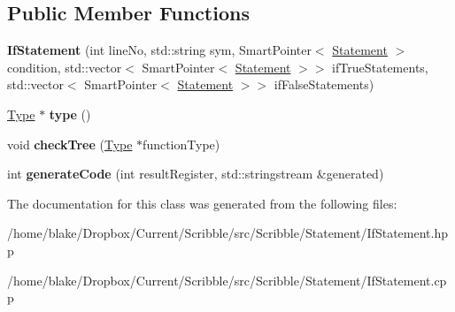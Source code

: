 \subsection*{Public Member Functions}
\begin{DoxyCompactItemize}
\item 
\hypertarget{class_scribble_core_1_1_if_statement_aaf95d7fc41a09df4f13d91a36bb6ce88}{{\bfseries If\-Statement} (int line\-No, std\-::string sym, Smart\-Pointer$<$ \hyperlink{class_scribble_core_1_1_statement}{Statement} $>$ condition, std\-::vector$<$ Smart\-Pointer$<$ \hyperlink{class_scribble_core_1_1_statement}{Statement} $>$$>$ if\-True\-Statements, std\-::vector$<$ Smart\-Pointer$<$ \hyperlink{class_scribble_core_1_1_statement}{Statement} $>$$>$ if\-False\-Statements)}\label{class_scribble_core_1_1_if_statement_aaf95d7fc41a09df4f13d91a36bb6ce88}

\item 
\hypertarget{class_scribble_core_1_1_if_statement_af5d5d3cc9c33f6879d254f11c2bec9eb}{\hyperlink{class_scribble_core_1_1_type}{Type} $\ast$ {\bfseries type} ()}\label{class_scribble_core_1_1_if_statement_af5d5d3cc9c33f6879d254f11c2bec9eb}

\item 
\hypertarget{class_scribble_core_1_1_if_statement_ade8ad73c43528ea7bc0fbf37f4380be8}{void {\bfseries check\-Tree} (\hyperlink{class_scribble_core_1_1_type}{Type} $\ast$function\-Type)}\label{class_scribble_core_1_1_if_statement_ade8ad73c43528ea7bc0fbf37f4380be8}

\item 
\hypertarget{class_scribble_core_1_1_if_statement_ac002e4a9ab0324d7168ad19aa7fc2369}{int {\bfseries generate\-Code} (int result\-Register, std\-::stringstream \&generated)}\label{class_scribble_core_1_1_if_statement_ac002e4a9ab0324d7168ad19aa7fc2369}

\end{DoxyCompactItemize}


The documentation for this class was generated from the following files\-:\begin{DoxyCompactItemize}
\item 
/home/blake/\-Dropbox/\-Current/\-Scribble/src/\-Scribble/\-Statement/If\-Statement.\-hpp\item 
/home/blake/\-Dropbox/\-Current/\-Scribble/src/\-Scribble/\-Statement/If\-Statement.\-cpp\end{DoxyCompactItemize}
